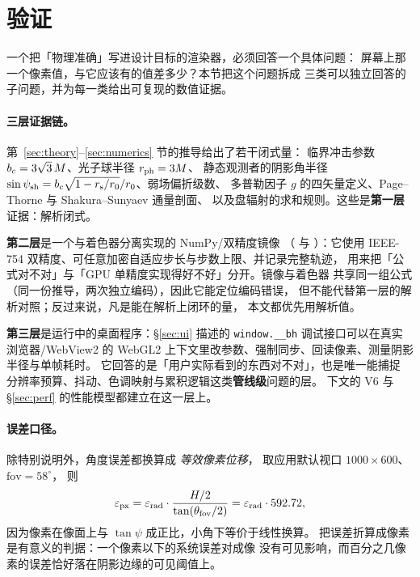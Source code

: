 \section{验证}\label{sec:verify}

一个把「物理准确」写进设计目标的渲染器，必须回答一个具体问题：
屏幕上那一个像素值，与它应该有的值差多少？本节把这个问题拆成
三类可以独立回答的子问题，并为每一类给出可复现的数值证据。

\paragraph{三层证据链。}
第~\ref{sec:theory}--\ref{sec:numerics} 节的推导给出了若干闭式量：
临界冲击参数 $b_{c}=3\sqrt3\,M$、光子球半径 $r_{\mathrm{ph}}=3M$、
静态观测者的阴影角半径
$\sin\psi_{\rm sh}=b_{c}\sqrt{1-r_{\mathrm s}/r_0}/r_0$、弱场偏折级数、
多普勒因子 $g$ 的四矢量定义、Page--Thorne 与 Shakura--Sunyaev 通量剖面、
以及盘辐射的求和规则。这些是\textbf{第一层}证据：解析闭式。

\textbf{第二层}是一个与着色器分离实现的 NumPy/双精度镜像
（ 与 ）：它使用
IEEE-754 双精度、可任意加密自适应步长与步数上限、并记录完整轨迹，
用来把「公式对不对」与「GPU 单精度实现得好不好」分开。镜像与着色器
共享同一组公式（同一份推导，两次独立编码），因此它能定位编码错误，
但不能代替第一层的解析对照；反过来说，凡是能在解析上闭环的量，
本文都优先用解析值。

\textbf{第三层}是运行中的桌面程序：\S\ref{sec:ui} 描述的
\texttt{window.\_\_bh} 调试接口可以在真实浏览器/WebView2 的
WebGL2 上下文里改参数、强制同步、回读像素、测量阴影半径与单帧耗时。
它回答的是「用户实际看到的东西对不对」，也是唯一能捕捉
分辨率预算、抖动、色调映射与累积逻辑这类\textbf{管线级}问题的层。
下文的 V6 与 \S\ref{sec:perf} 的性能模型都建立在这一层上。

\paragraph{误差口径。}
除特别说明外，角度误差都换算成 \emph{等效像素位移}，
取应用默认视口 $1000\times600$、$\mathrm{fov}=58^\circ$，
则
\begin{equation}
\varepsilon_{\rm px}=\varepsilon_{\rm rad}\cdot
\frac{H/2}{\tan(\theta_{\rm fov}/2)}
=\varepsilon_{\rm rad}\cdot 592.72 ,
\label{eq:px2rad}
\end{equation}
因为像素在像面上与 $\tan\psi$ 成正比，小角下等价于线性换算。
把误差折算成像素是有意义的判据：一个像素以下的系统误差对成像
没有可见影响，而百分之几像素的误差恰好落在阴影边缘的可见阈值上。


